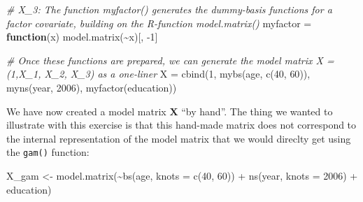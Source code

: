 \documentclass[
]{article}
\newenvironment{Shaded}{\begin{snugshade}}{\end{snugshade}}
\newcommand{\AttributeTok}[1]{\textcolor[rgb]{0.77,0.63,0.00}{#1}}
\newcommand{\CommentTok}[1]{\textcolor[rgb]{0.56,0.35,0.01}{\textit{#1}}}
\newcommand{\ControlFlowTok}[1]{\textcolor[rgb]{0.13,0.29,0.53}{\textbf{#1}}}
\newcommand{\DecValTok}[1]{\textcolor[rgb]{0.00,0.00,0.81}{#1}}
\newcommand{\FunctionTok}[1]{\textcolor[rgb]{0.00,0.00,0.00}{#1}}
\newcommand{\NormalTok}[1]{#1}
\newcommand{\OtherTok}[1]{\textcolor[rgb]{0.56,0.35,0.01}{#1}}
\newcommand{\SpecialCharTok}[1]{\textcolor[rgb]{0.00,0.00,0.00}{#1}}
\begin{document}
\begin{Shaded}
\begin{Highlighting}[]
\CommentTok{\# X\_3: The function myfactor() generates the dummy{-}basis functions for a factor covariate, building on the R{-}function model.matrix()}
\NormalTok{myfactor }\OtherTok{=} \ControlFlowTok{function}\NormalTok{(x) }\FunctionTok{model.matrix}\NormalTok{(}\SpecialCharTok{\textasciitilde{}}\NormalTok{x)[, }\SpecialCharTok{{-}}\DecValTok{1}\NormalTok{]}

\CommentTok{\# Once these functions are prepared, we can generate the model matrix X = (1,X\_1, X\_2, X\_3) as a one{-}liner}
\NormalTok{X }\OtherTok{=} \FunctionTok{cbind}\NormalTok{(}\DecValTok{1}\NormalTok{, }\FunctionTok{mybs}\NormalTok{(age, }\FunctionTok{c}\NormalTok{(}\DecValTok{40}\NormalTok{, }\DecValTok{60}\NormalTok{)), }\FunctionTok{myns}\NormalTok{(year, }\DecValTok{2006}\NormalTok{), }\FunctionTok{myfactor}\NormalTok{(education))}
\end{Highlighting}
\end{Shaded}

We have now created a model matrix \(\mathbf X\) ``by hand''. The thing
we wanted to illustrate with this exercise is that this hand-made matrix
does not correspond to the internal representation of the model matrix
that we would direclty get using the \texttt{gam()} function:

\begin{Shaded}
\begin{Highlighting}[]
\NormalTok{X\_gam }\OtherTok{\textless{}{-}} \FunctionTok{model.matrix}\NormalTok{(}\SpecialCharTok{\textasciitilde{}}\FunctionTok{bs}\NormalTok{(age, }\AttributeTok{knots =} \FunctionTok{c}\NormalTok{(}\DecValTok{40}\NormalTok{, }\DecValTok{60}\NormalTok{)) }\SpecialCharTok{+} \FunctionTok{ns}\NormalTok{(year, }\AttributeTok{knots =} \DecValTok{2006}\NormalTok{) }\SpecialCharTok{+}\NormalTok{ education)}
\end{Highlighting}
\end{Shaded}
\end{document}
